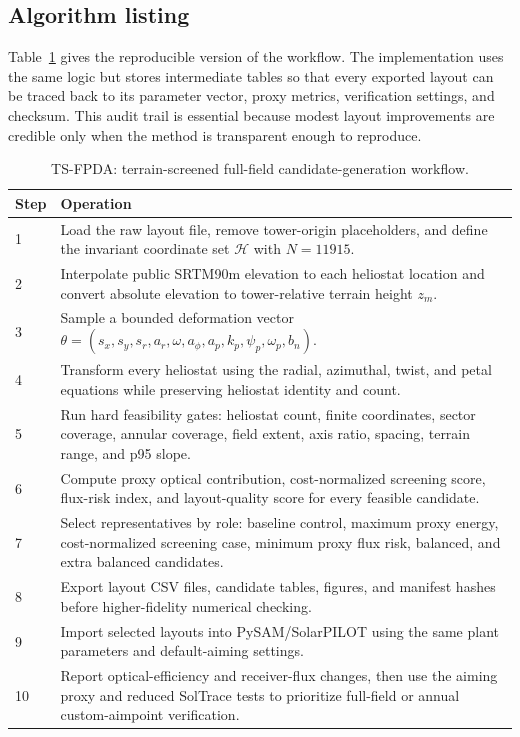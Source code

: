 \documentclass[final,3p,times]{elsarticle}
\begin{document}
\subsection{Algorithm listing}
Table~\ref{alg:tfpda} gives the reproducible version of the workflow. The implementation uses the same logic but stores intermediate tables so that every exported layout can be traced back to its parameter vector, proxy metrics, verification settings, and checksum. This audit trail is essential because modest layout improvements are credible only when the method is transparent enough to reproduce.

\begin{longtable}{p{}p{}}
\caption{TS-FPDA: terrain-screened full-field candidate-generation workflow.}
\label{alg:tfpda}\\
\toprule
Step & Operation \\
\midrule
1 & Load the raw layout file, remove tower-origin placeholders, and define the invariant coordinate set $\mathcal{H}$ with $N=11915$. \\
2 & Interpolate public SRTM90m elevation to each heliostat location and convert absolute elevation to tower-relative terrain height $z_m$. \\
3 & Sample a bounded deformation vector $\theta=(s_x,s_y,s_r,a_r,\omega,a_\phi,a_p,k_p,\psi_p,\omega_p,b_n)$. \\
4 & Transform every heliostat using the radial, azimuthal, twist, and petal equations while preserving heliostat identity and count. \\
5 & Run hard feasibility gates: heliostat count, finite coordinates, sector coverage, annular coverage, field extent, axis ratio, spacing, terrain range, and p95 slope. \\
6 & Compute proxy optical contribution, cost-normalized screening score, flux-risk index, and layout-quality score for every feasible candidate. \\
7 & Select representatives by role: baseline control, maximum proxy energy, cost-normalized screening case, minimum proxy flux risk, balanced, and extra balanced candidates. \\
8 & Export layout CSV files, candidate tables, figures, and manifest hashes before higher-fidelity numerical checking. \\
9 & Import selected layouts into PySAM/SolarPILOT using the same plant parameters and default-aiming settings. \\
10 & Report optical-efficiency and receiver-flux changes, then use the aiming proxy and reduced SolTrace tests to prioritize full-field or annual custom-aimpoint verification. \\
\bottomrule
\end{longtable}
\end{document}
